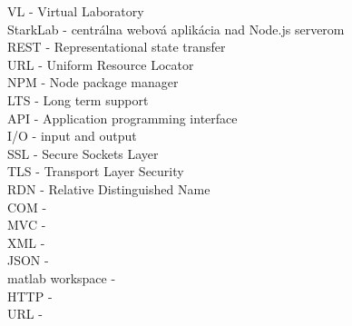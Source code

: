 VL - Virtual Laboratory\\
StarkLab - centrálna webová aplikácia nad Node.js serverom\\
REST - Representational state transfer\\
URL - Uniform Resource Locator\\
NPM - Node package manager\\
LTS - Long term support\\
API - Application programming interface\\
I/O - input and output\\
SSL - Secure Sockets Layer\\
TLS - Transport Layer Security\\
RDN - Relative Distinguished Name\\
COM - \\
MVC - \\
XML - \\
JSON - \\
matlab workspace - \\
HTTP - \\
URL - \\


